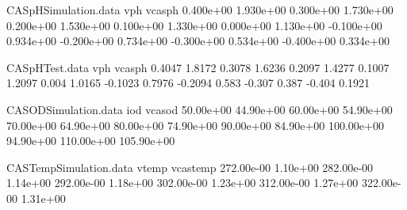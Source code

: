 
\begin{filecontents}{CASpHSimulation.data}
vph	vcasph
0.400e+00	1.930e+00
0.300e+00	1.730e+00
0.200e+00	1.530e+00
0.100e+00	1.330e+00
0.000e+00	1.130e+00
-0.100e+00	0.934e+00
-0.200e+00	0.734e+00
-0.300e+00	0.534e+00
-0.400e+00	0.334e+00
\end{filecontents}

\begin{filecontents}{CASpHTest.data}
vph	vcasph
0.4047	1.8172
0.3078	1.6236
0.2097	1.4277
0.1007	1.2097
0.004	1.0165
-0.1023	0.7976
-0.2094	0.583
-0.307	0.387
-0.404	0.1921
\end{filecontents}

\begin{filecontents}{CASODSimulation.data}
iod	vcasod
50.00e+00	44.90e+00
60.00e+00	54.90e+00
70.00e+00	64.90e+00
80.00e+00	74.90e+00
90.00e+00	84.90e+00
100.00e+00	94.90e+00
110.00e+00	105.90e+00
\end{filecontents}

\begin{filecontents}{CASTempSimulation.data}
vtemp	vcastemp
272.00e-00	1.10e+00
282.00e-00	1.14e+00
292.00e-00	1.18e+00
302.00e-00	1.23e+00
312.00e-00	1.27e+00
322.00e-00	1.31e+00
\end{filecontents}
